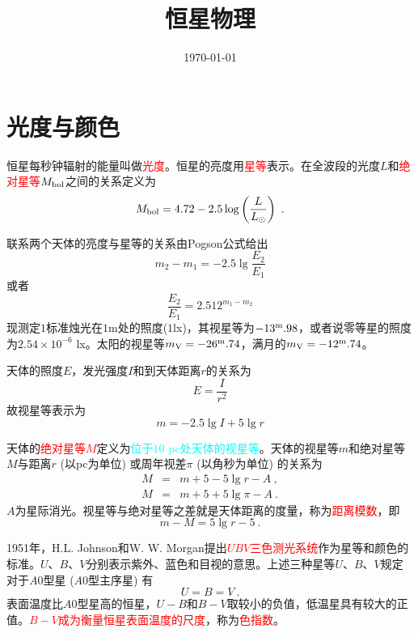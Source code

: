 \documentclass[12pt,a4paper]{article}
\title{恒星物理}
\author{}
\date{\today}
\begin{document}
\maketitle

\section{光度与颜色}
恒星每秒钟辐射的能量叫做\textcolor{red}{光度}。恒星的亮度用\textcolor{red}{星等}表示。在全波段的光度$L$和\textcolor{red}{绝对星等$M_{\rm bol}$}之间的关系定义为
\begin{equation}
M_{\rm bol} = 4.72 -2.5 \log \left(\frac{L}{L_{\odot}} \right) ~.
\end{equation}


联系两个天体的亮度与星等的关系由Pogson公式给出
\begin{equation}
m_2 -m_1 = -2.5 \lg \frac{E_2}{E_1}
\end{equation}
或者
\begin{equation}
\frac{E_2}{E_1} = 2.512^{m_1-m_2}
\end{equation}
现测定$1$标准烛光在$1$m处的照度($1$lx)，其视星等为$-13^{\rm m}.98$，或者说零等星的照度为$2.54\times 10^{-6}$ lx。太阳的视星等$m_{\rm V} = -26^{\rm m}.74$，满月的$m_{\rm V} = -12^{\rm m}.74$。

天体的照度$E$，发光强度$I$和到天体距离$r$的关系为
\begin{equation}
E = \frac{I}{r^2}
\end{equation}
故视星等表示为
\begin{equation}
m = -2.5\lg I + 5\lg r
\end{equation}

天体的\textcolor{red}{绝对星等$M$}定义为\textcolor{cyan}{位于$10$ pc处天体的视星等}。天体的视星等$m$和绝对星等$M$与距离$r$ (以pc为单位) 或周年视差$\pi$ (以角秒为单位) 的关系为
\begin{eqnarray}
M &=& m +5 -5\lg r -A ~, \\
M &=& m +5 +5\lg \pi -A ~.
\end{eqnarray}
$A$为星际消光。视星等与绝对星等之差就是天体距离的度量，称为\textcolor{red}{距离模数}，即
\begin{equation}
m - M= 5\lg r - 5 ~.
\end{equation}


1951年，H.L. Johnson和W. W. Morgan提出\textcolor{red}{$UBV$三色测光系统}作为星等和颜色的标准。$U$、$B$、$V$分别表示紫外、蓝色和目视的意思。上述三种星等$U$、$B$、$V$规定对于$A0$型星 ($A0$型主序星) 有
\begin{equation}
U = B = V ~.
\end{equation}
表面温度比$A0$型星高的恒星，$U-B$和$B-V$取较小的负值，低温星具有较大的正值。\textcolor{red}{$B-V$成为衡量恒星表面温度的尺度}，称为\textcolor{red}{色指数}。
\end{document}
